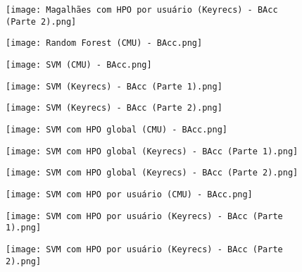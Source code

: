\begin{figure}[H]
    \caption{}
    \label{fig:st_user_keyrecs_bacc_2}
    \centering
    \texttt{[image: Magalhães com HPO por usuário (Keyrecs) - BAcc (Parte 2).png]}
\end{figure}
\begin{figure}[H]
    \caption{}
    \label{fig:rt_cmu_bacc}
    \centering
    \texttt{[image: Random Forest (CMU) - BAcc.png]}
\end{figure}
\begin{figure}[H]
    \caption{}
    \label{fig:svm_cmu_bacc}
    \centering
    \texttt{[image: SVM (CMU) - BAcc.png]}
\end{figure}
\begin{figure}[H]
    \caption{}
    \label{fig:svm_keyrecs_bacc_1}
    \centering
    \texttt{[image: SVM (Keyrecs) - BAcc (Parte 1).png]}
\end{figure}
\begin{figure}[H]
    \caption{}
    \label{fig:svm_keyrecs_bacc_2}
    \centering
    \texttt{[image: SVM (Keyrecs) - BAcc (Parte 2).png]}
\end{figure}
\begin{figure}[H]
    \caption{}
    \label{fig:svm_global_cmu_bacc}
    \centering
    \texttt{[image: SVM com HPO global (CMU) - BAcc.png]}
\end{figure}
\begin{figure}[H]
    \caption{}
    \label{fig:svm_global_keyrecs_bacc_1}
    \centering
    \texttt{[image: SVM com HPO global (Keyrecs) - BAcc (Parte 1).png]}  
\end{figure}
\begin{figure}[H]
    \caption{}
    \label{fig:svm_global_keyrecs_bacc_2}
    \centering
    \texttt{[image: SVM com HPO global (Keyrecs) - BAcc (Parte 2).png]}
\end{figure}
\begin{figure}[H]
    \caption{}
    \label{fig:svm_user_cmu_bacc}
    \centering
    \texttt{[image: SVM com HPO por usuário (CMU) - BAcc.png]}
\end{figure}
\begin{figure}[H]
    \caption{}
    \label{fig:svm_user_keyrecs_bacc_1}
    \centering
    \texttt{[image: SVM com HPO por usuário (Keyrecs) - BAcc (Parte 1).png]}
\end{figure}
\begin{figure}[H]
    \caption{}
    \label{fig:svm_user_keyrecs_bacc_2}
    \centering
    \texttt{[image: SVM com HPO por usuário (Keyrecs) - BAcc (Parte 2).png]}
\end{figure}
